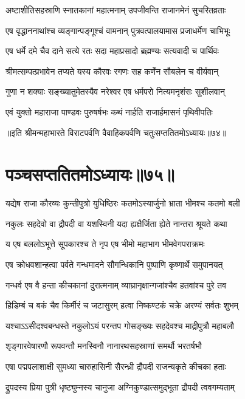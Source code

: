 \twolineshloka
{अष्टाशीतिसहस्राणि स्नातकानां महात्मनाम्}
{उपजीवन्ति राजानमेनं सुचरितव्रताः}


\twolineshloka
{एष वृद्धाननाथांश्च व्यङ्गान्पङ्गूश्चं वामनान्}
{पुत्रवत्पालयामास प्रजाधर्मेण चाभिभूः}


\twolineshloka
{एष धर्मे दमे चैव दाने सत्ये रतः सदा}
{महाप्रसादो ब्रह्मण्यः सत्यवादी च पार्थिवः}


\twolineshloka
{श्रीमत्सम्पत्प्रभावेन तप्यते यस्य कौरवः}
{रगणः सह कर्णेन सौबलेन च वीर्यवान्}


\twolineshloka
{गुणा न शक्याः सङ्ख्यातुमेतस्यैव नरेश्वर}
{एष धर्मपरो नित्यमनृशंसः सुशीलवान्}


\twolineshloka
{एवं युक्तो महाराजा पाण्डवः पुरुषर्षभः}
{कथं नार्हति राजार्हमासनं पृथिवीपतिः}

॥इति श्रीमन्महाभारते विराटपर्वणि वैवाहिकपर्वणि चतुःसप्ततितमोऽध्यायः॥७४॥

\chapter{पञ्चसप्ततितमोऽध्यायः॥७५॥}

\twolineshloka
{यद्येष राजा कौरव्यः कुन्तीपुत्रो युधिष्ठिरः}
{कतमोऽस्यार्जुनो भ्राता भीमश्च कतमो बली}


\twolineshloka
{नकुलः सहदेवो वा द्रौपदी वा यशस्विनी}
{यदा ह्यक्षैर्जिता ह्येते नान्तरा श्रूयते कथा}




\twolineshloka
{य एष बललोऽभूत्ते सूपकारश्च ते नृप}
{एष भीमो महाभाग भीमवेगपराक्रमः}


\twolineshloka
{एष क्रोधवशान्हत्वा पर्वते गन्धमादने}
{सौगन्धिकानि पुष्पाणि कृष्णार्थे समुपानयत्}


\twolineshloka
{गन्धर्व एष वै हन्ता कीचकानां दुरात्मनाम्}
{व्याघ्रानृक्षान्गजांश्चैव हतवांश्च पुरे तव}


\twolineshloka
{हिडिम्बं च बकं चैव किर्मीरं च जटासुरम्}
{हत्वा निष्कण्टकं चक्रे अरण्यं सर्वतः शुभम्}


\twolineshloka
{यश्चाऽऽसीदश्वबन्धस्ते नकुलोऽयं परन्तप}
{गोसङ्ख्यः सहदेवश्च माद्रीपुत्रौ महाबलौ}


\twolineshloka
{शृङ्गारवेषारणौ रूपवन्तौ मनस्विनौ}
{नानारथसहस्राणां समर्थौ भरतर्षभौ}


\twolineshloka
{एषा पद्मपलाशाक्षी सुमध्या चारुहासिनी}
{सैरन्ध्री द्रौपदी राजन्यकृते कीचका हताः}


\twolineshloka
{द्रुपदस्य प्रिया पुत्री धृष्ट्युम्नस्य चानुजा}
{अग्निकुण्डात्समुद्भूता द्रौपदी त्ववगम्यताम्}


